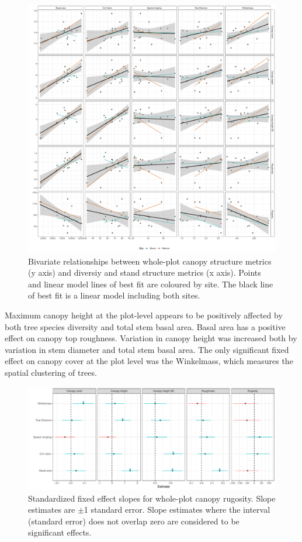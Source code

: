 \documentclass[11pt,a4paper]{article}
\begin{document}
\begin{figure}[H]
\centering
	\includegraphics[width=\textwidth]{canopy_rough_mod_bivar}
	\caption{Bivariate relationships between whole-plot canopy structure metrics (y axis) and diversiy and stand structure metrics (x axis). Points and linear model lines of best fit are coloured by site. The black line of best fit is a linear model including both sites.}
	\label{canopy_rough_mod_bivar}
\end{figure}

Maximum canopy height at the plot-level appears to be positively affected by both tree species diversity and total stem basal area. Basal area has a positive effect on canopy top roughness. Variation in canopy height was increased both by variation in stem diameter and total stem basal area. The only significant fixed effect on canopy cover at the plot level was the Winkelmass, which measures the spatial clustering of trees.

\begin{figure}[H]
\centering
	\includegraphics[width=\textwidth]{canopy_rough_slopes}
	\caption{Standardized fixed effect slopes for whole-plot canopy rugosity. Slope estimates are $\pm$1 standard error. Slope estimates where the interval (standard error) does not overlap zero are considered to be significant effects.}
	\label{canopy_rough_slopes}
\end{figure}
\end{document}
